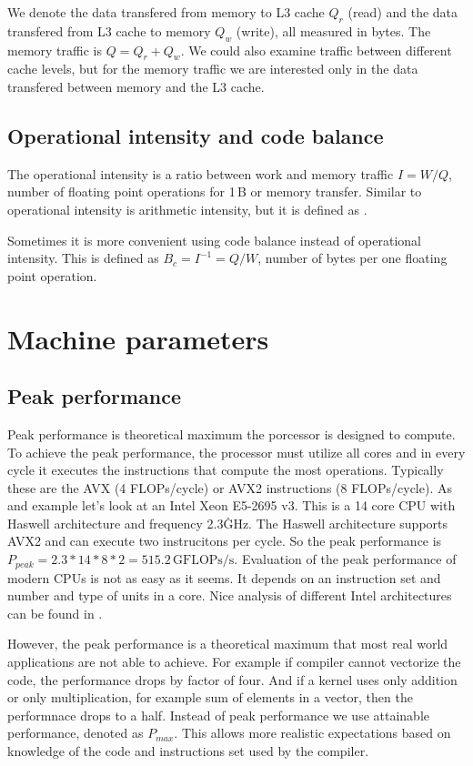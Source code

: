 {We denote the data transfered from memory to L3 cache $Q_r$ (read) and the data transfered from L3 cache to memory $Q_w$ (write), all measured in bytes. The memory traffic is $Q = Q_r + Q_w$.
We could also examine traffic between different cache levels, but for the memory traffic we are interested only in the data transfered between memory and the L3 cache.

\subsection*{Operational intensity and code balance}

The operational intensity is a ratio between work and memory traffic $I = W / Q$, number of floating point operations for 1\,B or memory transfer.
Similar to operational intensity is arithmetic intensity, but it is defined as .

Sometimes it is more convenient using code balance instead of operational intensity. This is defined as $B_c = I^{-1} = Q / W$, number of bytes per one floating point operation.

\section{Machine parameters}

\subsection*{Peak performance}

Peak performance is theoretical maximum the porcessor is designed to compute. To achieve the peak performance, the processor must utilize all cores and in every cycle it executes the instructions that compute the most operations. Typically these are the AVX (4 FLOPs/cycle) or AVX2 instructions (8 FLOPs/cycle).
As and example let's look at an Intel Xeon E5-2695 v3. This is a 14 core CPU with Haswell architecture and frequency 2.3\.GHz. The Haswell architecture supports AVX2 and can execute two instrucitons per cycle.
So the peak performance is $P_{peak} = 2.3 * 14 * 8 * 2 = 515.2\,\textrm{GFLOPs/s}$.
Evaluation of the peak performance of modern CPUs is not as easy as it seems. It depends on an instruction set and number and type of units in a core. Nice analysis of different Intel architectures can be found in \cite{dolbeau-2018}.

However, the peak performance is a theoretical maximum that most real world applications are not able to achieve.
For example if compiler cannot vectorize the code, the performance drops by factor of four. And if a kernel uses only addition or only multiplication, for example sum of elements in a vector, then the performnace drops to a half.
Instead of peak performance we use attainable performance, denoted as $P_{max}$. This allows more realistic expectations based on knowledge of the code and instructions set used by the compiler.

}
